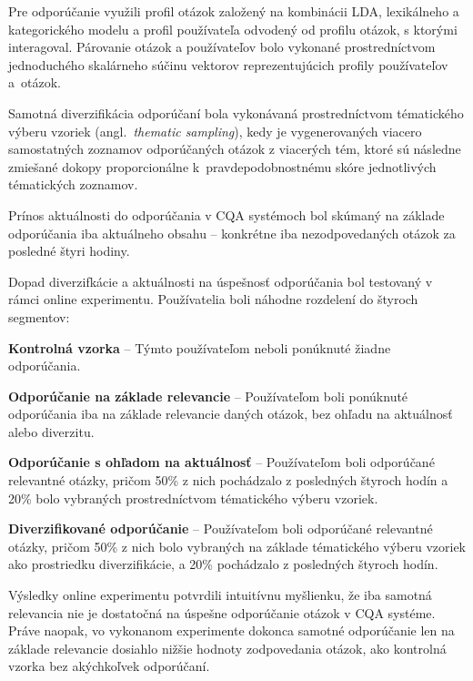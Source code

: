 Pre odporúčanie využili profil otázok založený na kombinácii LDA, lexikálneho a kategorického modelu a profil používateľa
odvodený od profilu otázok, s ktorými interagoval. Párovanie otázok a používateľov bolo vykonané prostredníctvom jednoduchého
skalárneho súčinu vektorov reprezentujúcich profily používateľov a~otázok.

Samotná diverzifikácia odporúčaní bola vykonávaná prostredníctvom tématického výberu vzoriek (angl.~\emph{thematic sampling}),
kedy je vygenerovaných viacero samostatných zoznamov odporúčaných otázok z viacerých tém, ktoré sú následne zmiešané dokopy
proporcionálne k~pravdepodobnostnému skóre jednotlivých tématických zoznamov.

Prínos aktuálnosti do odporúčania v CQA systémoch bol skúmaný na základe odporúčania iba aktuálneho obsahu -- konkrétne
iba nezodpovedaných otázok za posledné štyri hodiny.

Dopad diverzifkácie a aktuálnosti na úspešnosť odporúčania bol testovaný v rámci online experimentu. Používatelia boli náhodne
rozdelení do štyroch segmentov:

\begin{my_enumerate}
  \item{\textbf{Kontrolná vzorka} -- Týmto používateľom neboli ponúknuté žiadne odporúčania.}
  \item{\textbf{Odporúčanie na základe relevancie} -- Používateľom boli ponúknuté odporúčania iba na základe relevancie
        daných otázok, bez ohľadu na aktuálnosť alebo diverzitu.}
  \item{\textbf{Odporúčanie s ohľadom na aktuálnosť} -- Používateľom boli odporúčané relevantné otázky, pričom 50\% z nich
        pochádzalo z posledných štyroch hodín a 20\% bolo vybraných prostredníctvom tématického výberu vzoriek.}
  \item{\textbf{Diverzifikované odporúčanie} -- Používateľom boli odporúčané relevantné otázky, pričom 50\% z nich
        bolo vybraných na základe tématického výberu vzoriek ako prostriedku diverzifikácie, a 20\% pochádzalo z posledných
        štyroch hodín.}
\end{my_enumerate}

Výsledky online experimentu potvrdili intuitívnu myšlienku, že iba samotná relevancia nie je dostatočná na úspešne
odporúčanie otázok v CQA systéme. Práve naopak, vo vykonanom experimente dokonca samotné odporúčanie len na základe
relevancie dosiahlo nižšie hodnoty zodpovedania otázok, ako kontrolná vzorka bez akýchkoľvek odporúčaní.

